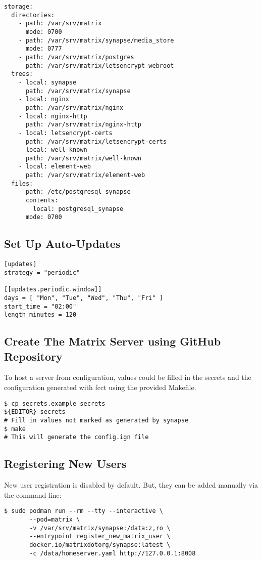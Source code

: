 \documentclass{article}
\begin{document}
\begin{lstlisting}
storage:
  directories:
    - path: /var/srv/matrix
      mode: 0700
    - path: /var/srv/matrix/synapse/media_store
      mode: 0777
    - path: /var/srv/matrix/postgres
    - path: /var/srv/matrix/letsencrypt-webroot
  trees:
    - local: synapse
      path: /var/srv/matrix/synapse
    - local: nginx
      path: /var/srv/matrix/nginx
    - local: nginx-http
      path: /var/srv/matrix/nginx-http
    - local: letsencrypt-certs
      path: /var/srv/matrix/letsencrypt-certs
    - local: well-known
      path: /var/srv/matrix/well-known
    - local: element-web
      path: /var/srv/matrix/element-web
  files:
    - path: /etc/postgresql_synapse
      contents:
        local: postgresql_synapse
      mode: 0700
\end{lstlisting}


\subsection{Set Up Auto-Updates}
\begin{lstlisting}
[updates]
strategy = "periodic"

[[updates.periodic.window]]
days = [ "Mon", "Tue", "Wed", "Thu", "Fri" ]
start_time = "02:00"
length_minutes = 120
\end{lstlisting}

\subsection{Create The Matrix Server using GitHub Repository}
To host a server from configuration, values could be filled in the secrets and the configuration generated with fcct using the provided Makefile. 
\begin{lstlisting}
$ cp secrets.example secrets
${EDITOR} secrets
# Fill in values not marked as generated by synapse
$ make
# This will generate the config.ign file

\end{lstlisting}

\subsection{Registering New Users}
New user registration is disabled by default. But, they can be added manually via the command line: 
\begin{lstlisting}
$ sudo podman run --rm --tty --interactive \
       --pod=matrix \
       -v /var/srv/matrix/synapse:/data:z,ro \
       --entrypoint register_new_matrix_user \
       docker.io/matrixdotorg/synapse:latest \
       -c /data/homeserver.yaml http://127.0.0.1:8008
\end{lstlisting}
\end{document}
